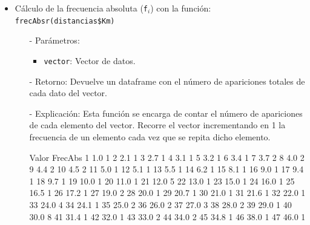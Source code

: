 \documentclass[a4paper, 12pt]{article}
\begin{document}
\begin{itemize}
		\item Cálculo de la frecuencia absoluta (\texttt{f$_{i}$}) con la función: \texttt{frecAbsr(distancias\$Km)}
		\begin{itemize}
			\item[-] Parámetros: 
			\begin{itemize}
				\item \texttt{vector}: Vector de datos.
			\end{itemize}
			
			\item[-] Retorno: Devuelve un dataframe con el número de apariciones totales de cada dato del vector. 
			
			\item[-] Explicación: Esta función se encarga de contar el número de apariciones de cada elemento del vector. Recorre el vector incrementando en 1 la frecuencia de un elemento cada vez que se repita dicho elemento.
\begin{Schunk}
\begin{Soutput}
   Valor FrecAbs
1    1.0       1
2    2.1       1
3    2.7       1
4    3.1       1
5    3.2       1
6    3.4       1
7    3.7       2
8    4.0       2
9    4.4       2
10   4.5       2
11   5.0       1
12   5.1       1
13   5.5       1
14   6.2       1
15   8.1       1
16   9.0       1
17   9.4       1
18   9.7       1
19  10.0       1
20  11.0       1
21  12.0       5
22  13.0       1
23  15.0       1
24  16.0       1
25  16.5       1
26  17.2       1
27  19.0       2
28  20.0       1
29  20.7       1
30  21.0       1
31  21.6       1
32  22.0       1
33  24.0       4
34  24.1       1
35  25.0       2
36  26.0       2
37  27.0       3
38  28.0       2
39  29.0       1
40  30.0       8
41  31.4       1
42  32.0       1
43  33.0       2
44  34.0       2
45  34.8       1
46  38.0       1
47  46.0       1
\end{Soutput}
\end{Schunk}
		\end{itemize}
		

\end{itemize}
\end{document}
